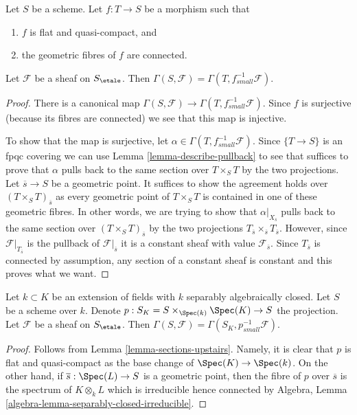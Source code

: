 \begin{lemma}
\label{lemma-sections-upstairs}
Let $S$ be a scheme. Let $f : T \to S$ be a morphism such that
\begin{enumerate}
\item $f$ is flat and quasi-compact, and
\item the geometric fibres of $f$ are connected.
\end{enumerate}
Let $\mathcal{F}$ be a sheaf on $S_\etale$.
Then $\Gamma(S, \mathcal{F}) = \Gamma(T, f^{-1}_{small}\mathcal{F})$.
\end{lemma}

\begin{proof}
There is a canonical map
$\Gamma(S, \mathcal{F}) \to \Gamma(T, f_{small}^{-1}\mathcal{F})$.
Since $f$ is surjective (because its fibres are connected) we see that
this map is injective.

\medskip\noindent
To show that the map is surjective, let
$\alpha \in \Gamma(T, f_{small}^{-1}\mathcal{F})$.
Since $\{T \to S\}$ is an fpqc covering we can use
Lemma \ref{lemma-describe-pullback} to see that suffices to prove that
$\alpha$ pulls back to the same section over $T \times_S T$ by the
two projections. Let $\overline{s} \to S$ be a geometric point.
It suffices to show the agreement holds over $(T \times_S T)_{\overline{s}}$
as every geometric point of $T \times_S T$ is contained in one of
these geometric fibres. In other words, we are trying to show that
$\alpha|_{X_{\overline{s}}}$ pulls back to the same section over
$(T \times_S T)_{\overline{s}}$ by the two projections
$T_{\overline{s}} \times_{\overline{s}} T_{\overline{s}}$.
However, since $\mathcal{F}|_{T_{\overline{s}}}$ is the
pullback of $\mathcal{F}|_{\overline{s}}$ it is a constant sheaf
with value $\mathcal{F}_{\overline{s}}$. Since $T_{\overline{s}}$
is connected by assumption, any section of a constant sheaf is constant
and this proves what we want.
\end{proof}

\begin{lemma}
\label{lemma-sections-base-field-extension}
Let $k \subset K$ be an extension of fields with $k$ separably
algebraically closed. Let $S$ be a scheme over $k$. Denote
$p : S_K = S \times_{\Spec(k)} \Spec(K) \to S$ the projection.
Let $\mathcal{F}$ be a sheaf on $S_\etale$.
Then $\Gamma(S, \mathcal{F}) = \Gamma(S_K, p^{-1}_{small}\mathcal{F})$.
\end{lemma}

\begin{proof}
Follows from Lemma \ref{lemma-sections-upstairs}. Namely, it is clear
that $p$ is flat and quasi-compact as the base change of
$\Spec(K) \to \Spec(k)$. On the other hand, if $\overline{s} : \Spec(L) \to S$
is a geometric point, then the fibre of $p$ over $\overline{s}$
is the spectrum of $K \otimes_k L$ which is irreducible hence connected by
Algebra, Lemma \ref{algebra-lemma-separably-closed-irreducible}.
\end{proof}









